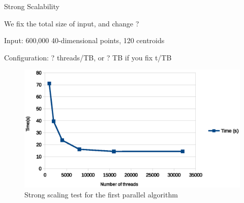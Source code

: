 \documentclass[
nopagebreaks,
style=klope,
fleqn]{powerdot}
\begin{document}
\begin{slide}{Strong Scalability}

  \begin{compactitem}
  \item{We fix the total size of input, and change ?}
  \item{Input: 600,000 40-dimensional points, 120 centroids}
  \item{Configuration: ? threads/TB, or ? TB if you fix t/TB}
  \end{compactitem}

\begin{figure}[!h]
  \centering
  \includegraphics[width=0.7\linewidth]{fig/strong_scaling}
  \caption{Strong scaling test for the first parallel algorithm}
  \label{fig:strong_scaling}
\end{figure}
\end{slide}
\end{document}
